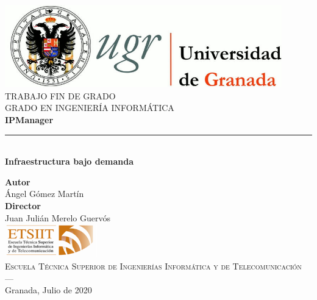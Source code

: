 \begin{titlepage}
 
 
\newlength{\centeroffset}
\setlength{\centeroffset}{-0.5\oddsidemargin}
\addtolength{\centeroffset}{0.5\evensidemargin}
\thispagestyle{empty}

\noindent\hspace*{\centeroffset}\begin{minipage}{\textwidth}

\centering
\includegraphics[width=0.9\textwidth]{imagenes/logo_ugr.jpg}\\[1.4cm]

\textsc{ \Large TRABAJO FIN DE GRADO\\[0.2cm]}
\textsc{GRADO EN INGENIERÍA INFORMÁTICA}\\[1cm]
% 
{\Huge\bfseries IPManager\\}
\noindent\rule[-1ex]{\textwidth}{3pt}\\[3.5ex]
{\large\bfseries Infraestructura bajo demanda}
\end{minipage}

\vspace{2.5cm}
\noindent\hspace*{\centeroffset}\begin{minipage}{\textwidth}
\centering

\textbf{Autor}\\{Ángel Gómez Martín}\\[2.5ex]
\textbf{Director}\\Juan Julián Merelo Guervós\\[2cm]
\includegraphics[width=0.3\textwidth]{imagenes/etsiit_logo.png}\\[0.1cm]
\textsc{Escuela Técnica Superior de Ingenierías Informática y de Telecomunicación}\\
\textsc{---}\\
Granada, Julio de 2020
\end{minipage}
\end{titlepage}


